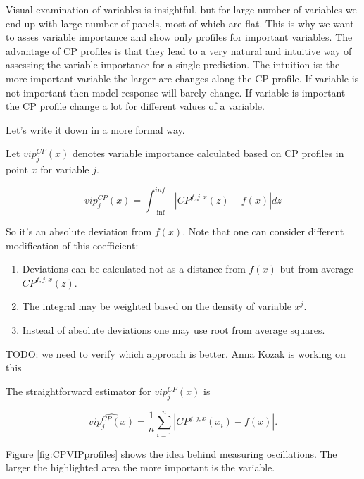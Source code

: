 \documentclass[]{book}
\providecommand{\tightlist}{%
  \setlength{\itemsep}{0pt}\setlength{\parskip}{0pt}}
\theoremstyle{definition}
\theoremstyle{definition}
\theoremstyle{definition}
\theoremstyle{remark}
\begin{document}
Visual examination of variables is insightful, but for large number of
variables we end up with large number of panels, most of which are flat.
This is why we want to asses variable importance and show only profiles
for important variables. The advantage of CP profiles is that they lead
to a very natural and intuitive way of assessing the variable importance
for a single prediction. The intuition is: the more important variable
the larger are changes along the CP profile. If variable is not
important then model response will barely change. If variable is
important the CP profile change a lot for different values of a
variable.

Let's write it down in a more formal way.

Let \(vip^{CP}_j(x)\) denotes variable importance calculated based on CP
profiles in point \(x\) for variable \(j\).

\[
vip^{CP}_j(x) = \int_{-\inf}^{inf} |CP^{f,j,x}(z) - f(x)| dz
\]

So it's an absolute deviation from \(f(x)\). Note that one can consider
different modification of this coefficient:

\begin{enumerate}
\def\labelenumi{\arabic{enumi}.}
\tightlist
\item
  Deviations can be calculated not as a distance from \(f(x)\) but from
  average \(\bar CP^{f,j,x}(z)\).
\item
  The integral may be weighted based on the density of variable \(x^j\).
\item
  Instead of absolute deviations one may use root from average squares.
\end{enumerate}

TODO: we need to verify which approach is better. Anna Kozak is working
on this

The straightforward estimator for \(vip^{CP}_j(x)\) is

\[
\widehat{ vip^{CP}_j(x)} = \frac 1n \sum_{i=1}^n |CP^{f,j,x}(x_i) - f(x)|.
\]

Figure \ref{fig:CPVIPprofiles} shows the idea behind measuring
oscillations. The larger the highlighted area the more important is the
variable.
\end{document}
